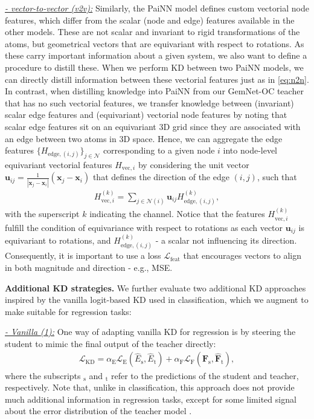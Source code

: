 \documentclass{article}
\newcommand{\loss}{\mathcal{L}}
\begin{document}
\underline{\emph{- vector-to-vector (v2v):}} Similarly, the PaiNN model defines custom vectorial node features, which differ from the scalar (node and edge) features available in the other models. These are not scalar and invariant to rigid transformations of the atoms, but geometrical vectors that are equivariant with respect to rotations. As these carry important information about a given system, we also want to define a procedure to distill these. When we perform KD between two PaiNN models, we can directly distill information between these vectorial features just as in \cref{eq:n2n}. In contrast, when distilling knowledge into PaiNN from our GemNet-OC teacher that has no such vectorial features, we transfer knowledge between (invariant) scalar edge features and (equivariant) vectorial node features by noting that scalar edge features sit on an equivariant 3D grid since they are associated with an edge between two atoms in 3D space. Hence, we can aggregate the edge features $\{H_{\text{edge}, (i,j)}\}_{j\in \mathcal{N}}$ corresponding to a given node $i$ into node-level equivariant vectorial features $H_{\text{vec}, i}$ by considering the unit vector $\boldsymbol{u}_{ij} = \frac{1}{|\boldsymbol{x}_j - \boldsymbol{x}_i|}(\boldsymbol{x}_j - \boldsymbol{x}_i)$ that defines the direction of the edge $(i,j)$, such that
\begin{align}
    H_{\text{vec}, i}^{(k)} = \sum_{j\in\mathcal{N}(i)} \boldsymbol{u}_{ij} H_{\text{edge}, (i,j)}^{(k)},
\end{align}
with the superscript $k$ indicating the channel. Notice that the features $H_{\text{vec}, i}^{(k)}$ fulfill the condition of equivariance with respect to rotations as each vector $\boldsymbol{u}_{ij}$ is equivariant to rotations, and $H_{\text{edge}, (i,j)}^{(k)}$ - a scalar not influencing its direction. Consequently, it is important to use a loss $\loss_{\text{feat}}$ that encourages vectors to align in both magnitude and direction - e.g., MSE.

\textbf{Additional KD strategies.}
We further evaluate two additional KD approaches inspired by the vanilla logit-based KD used in classification, which we augment to make suitable for regression tasks:

\underline{\emph{- Vanilla (1):}} 
One way of adapting vanilla KD for regression is by steering the student to mimic the final output of the teacher directly:
\begin{align}
    \loss_{\text{KD}} = \alpha_\text{E} \loss_\text{E}(\hat{E}_\text{s}, \hat{E}_\text{t}) +  \alpha_\text{F} \loss_\text{F}(\hat{\boldsymbol{F}}_\text{s}, \hat{\boldsymbol{F}}_\text{t}),
\end{align}
where the subscripts $_\text{s}$ and $_\text{t}$ refer to the predictions of the student and teacher, respectively. Note that, unlike in classification, this approach does not provide much additional information in regression tasks, except for some limited signal about the error distribution of the teacher model \cite{cheng2018model, saputra2019distilling}.
\end{document}
